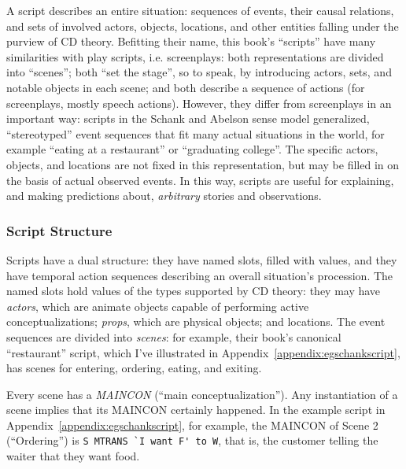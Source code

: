 %

A script describes an entire situation: sequences of events, their causal relations, and sets of involved actors, objects, locations, and other entities falling under the purview of CD theory. Befitting their name, this book's ``scripts'' have many similarities with play scripts, i.e. screenplays: both representations are divided into ``scenes''; both ``set the stage'', so to speak, by introducing actors, sets, and notable objects in each scene; and both describe a sequence of actions (for screenplays, mostly speech actions). However, they differ from screenplays in an important way: scripts in the Schank and Abelson sense model generalized, ``stereotyped'' event sequences that fit many actual situations in the world, for example ``eating at a restaurant'' or ``graduating college''. The specific actors, objects, and locations are not fixed in this representation, but may be filled in on the basis of actual observed events. In this way, scripts are useful for explaining, and making predictions about, \textit{arbitrary} stories and observations.

\subsubsection{Script Structure}
Scripts have a dual structure: they have named slots, filled with values, %
and they have temporal action sequences describing an overall situation's procession. The named slots hold values of the types supported by CD theory: they may have \textit{actors}, which are animate objects capable of performing active conceptualizations; \textit{props}, which are physical objects; and locations. The event sequences are divided into \textit{scenes}: for example, their book's canonical ``restaurant'' script, which I've illustrated in Appendix~\ref{appendix:egschankscript}, has scenes for entering, ordering, eating, and exiting.

Every scene has a \textit{MAINCON} (``main conceptualization''). Any instantiation of a scene implies that its MAINCON certainly happened. In the example script in Appendix~\ref{appendix:egschankscript}, for example, the MAINCON of Scene 2 (``Ordering'') is \lstinline{S MTRANS `I want F' to W}, that is, the customer telling the waiter that they want food.

